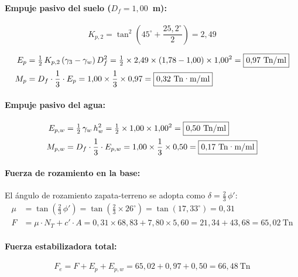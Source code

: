 \paragraph{Empuje pasivo del suelo ($D_f = 1{,}00$~m):}

\begin{equation}
  K_{p,2} = \tan^2\!\left(45^\circ + \frac{25{,}2^\circ}{2}\right) = 2{,}49
\end{equation}

\begin{align*}
  E_p &= \tfrac{1}{2}\,K_{p,2}\,(\gamma_3-\gamma_w)\,D_f^2
        = \tfrac{1}{2} \times 2{,}49 \times (1{,}78-1{,}00) \times 1{,}00^2
        = \boxed{0{,}97~\text{Tn/ml}} \\
  M_p &= D_f \cdot \frac{1}{3} \cdot E_p = 1{,}00 \times \frac{1}{3} \times 0{,}97
        = \boxed{0{,}32~\text{Tn·m/ml}}
\end{align*}

\paragraph{Empuje pasivo del agua:}

\begin{align*}
  E_{p,w} &= \tfrac{1}{2}\,\gamma_w\,h_w^2
            = \tfrac{1}{2} \times 1{,}00 \times 1{,}00^2 = \boxed{0{,}50~\text{Tn/ml}} \\
  M_{p,w} &= D_f \cdot \frac{1}{3} \cdot E_{p,w}
            = 1{,}00 \times \frac{1}{3} \times 0{,}50 = \boxed{0{,}17~\text{Tn·m/ml}}
\end{align*}

\paragraph{Fuerza de rozamiento en la base:}

El ángulo de rozamiento zapata-terreno se adopta como $\delta = \tfrac{2}{3}\,\phi'$:
\begin{align*}
  \mu &= \tan\!\left(\frac{2}{3}\,\phi'\right)
        = \tan\!\left(\frac{2}{3} \times 26^\circ\right)
        = \tan(17{,}33^\circ) = 0{,}31 \\[4pt]
  F   &= \mu \cdot N_T + c' \cdot A
        = 0{,}31 \times 68{,}83 + 7{,}80 \times 5{,}60
        = 21{,}34 + 43{,}68 = 65{,}02~\text{Tn}
\end{align*}

\paragraph{Fuerza estabilizadora total:}
\[
  F_e = F + E_p + E_{p,w} = 65{,}02 + 0{,}97 + 0{,}50 = 66{,}48~\text{Tn}
\]

